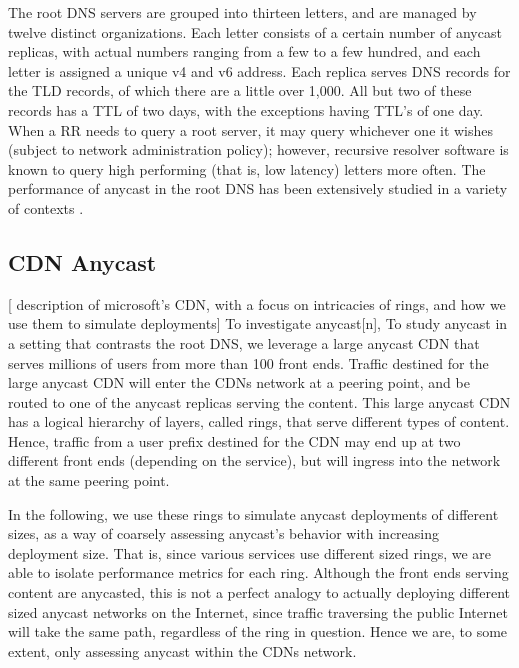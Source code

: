 \documentclass[sigconf,letterpaper,nonacm,10pt]{acmart}
\begin{document}
The root DNS servers \cite{root_servers} are grouped into thirteen
letters, and are managed by twelve distinct organizations. Each letter
consists of a certain number of anycast replicas, with actual numbers
ranging from a few to a few hundred, and each letter is assigned a
unique v4 and v6 address. Each replica serves DNS records for the TLD
records, of which there are a little over 1,000. All but two of these
records has a TTL of two days, with the exceptions having TTL's of one
day. When a RR needs to query a root server, it may query whichever one
it wishes (subject to network administration policy); however, recursive
resolver software is known to query high performing (that is, low
latency) letters more often. The performance of anycast in the root DNS
has been extensively studied in a variety of contexts
\cite{colitti2006evaluating, moura2016anycast, de2017anycast, li_levin_spring_bhattacharjee_2018, mcquistin2019taming}.

\hypertarget{cdn-anycast}{%
\subsection{CDN Anycast}\label{cdn-anycast}}

{[} description of microsoft's CDN, with a focus on intricacies of
rings, and how we use them to simulate deployments{]} To investigate
anycast{[}n{]}, To study anycast in a setting that contrasts the root
DNS, we leverage a large anycast CDN that serves millions of users from
more than 100 front ends. Traffic destined for the large anycast CDN
will enter the CDNs network at a peering point, and be routed to one of
the anycast replicas serving the content. This large anycast CDN has a
logical hierarchy of layers, called rings, that serve different types of
content. Hence, traffic from a user prefix destined for the CDN may end
up at two different front ends (depending on the service), but will
ingress into the network at the same peering point.

In the following, we use these rings to simulate anycast deployments of
different sizes, as a way of coarsely assessing anycast's behavior with
increasing deployment size. That is, since various services use
different sized rings, we are able to isolate performance metrics for
each ring. Although the front ends serving content are anycasted, this
is not a perfect analogy to actually deploying different sized anycast
networks on the Internet, since traffic traversing the public Internet
will take the same path, regardless of the ring in question. Hence we
are, to some extent, only assessing anycast within the CDNs network.
\end{document}

